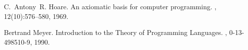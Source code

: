 \documentclass[twoside,twocolumn]{article}
\begin{document}
\begin{thebibliography}{99} %

C.~Antony~R. Hoare.
\newblock An axiomatic basis for computer programming.
, 12(10):576--580, 1969.

Bertrand Meyer.
\newblock Introduction to the Theory of Programming Languages.
, 0-13-498510-9, 1990.

\end{thebibliography}

\end{document}

